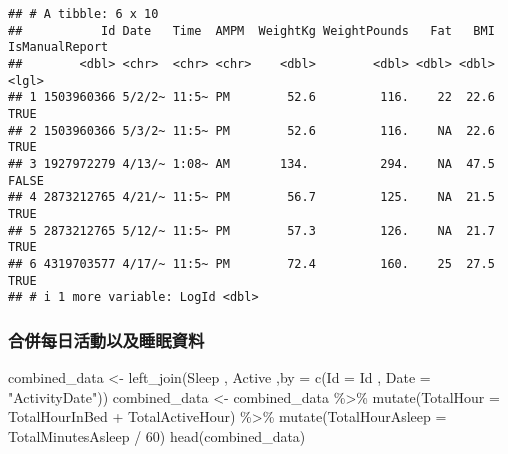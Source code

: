 \documentclass[
]{article}
\newenvironment{Shaded}{\begin{snugshade}}{\end{snugshade}}
\newcommand{\AttributeTok}[1]{\textcolor[rgb]{0.77,0.63,0.00}{#1}}
\newcommand{\DecValTok}[1]{\textcolor[rgb]{0.00,0.00,0.81}{#1}}
\newcommand{\FunctionTok}[1]{\textcolor[rgb]{0.00,0.00,0.00}{#1}}
\newcommand{\NormalTok}[1]{#1}
\newcommand{\OtherTok}[1]{\textcolor[rgb]{0.56,0.35,0.01}{#1}}
\newcommand{\SpecialCharTok}[1]{\textcolor[rgb]{0.00,0.00,0.00}{#1}}
\newcommand{\StringTok}[1]{\textcolor[rgb]{0.31,0.60,0.02}{#1}}
\begin{document}
\begin{verbatim}
## # A tibble: 6 x 10
##           Id Date   Time  AMPM  WeightKg WeightPounds   Fat   BMI IsManualReport
##        <dbl> <chr>  <chr> <chr>    <dbl>        <dbl> <dbl> <dbl> <lgl>         
## 1 1503960366 5/2/2~ 11:5~ PM        52.6         116.    22  22.6 TRUE          
## 2 1503960366 5/3/2~ 11:5~ PM        52.6         116.    NA  22.6 TRUE          
## 3 1927972279 4/13/~ 1:08~ AM       134.          294.    NA  47.5 FALSE         
## 4 2873212765 4/21/~ 11:5~ PM        56.7         125.    NA  21.5 TRUE          
## 5 2873212765 5/12/~ 11:5~ PM        57.3         126.    NA  21.7 TRUE          
## 6 4319703577 4/17/~ 11:5~ PM        72.4         160.    25  27.5 TRUE          
## # i 1 more variable: LogId <dbl>
\end{verbatim}

\hypertarget{ux5408ux4f75ux6bcfux65e5ux6d3bux52d5ux4ee5ux53caux7761ux7720ux8cc7ux6599}{%
\subsubsection{合併每日活動以及睡眠資料}\label{ux5408ux4f75ux6bcfux65e5ux6d3bux52d5ux4ee5ux53caux7761ux7720ux8cc7ux6599}}

\begin{Shaded}
\begin{Highlighting}[]
\NormalTok{combined\_data }\OtherTok{\textless{}{-}} \FunctionTok{left\_join}\NormalTok{(Sleep , Active ,}\AttributeTok{by =} \FunctionTok{c}\NormalTok{(}\StringTok{\textquotesingle{}Id\textquotesingle{}}  \OtherTok{=} \StringTok{\textquotesingle{}Id\textquotesingle{}}\NormalTok{ , }\StringTok{\textquotesingle{}Date\textquotesingle{}} \OtherTok{=} \StringTok{"ActivityDate"}\NormalTok{))}
\NormalTok{combined\_data }\OtherTok{\textless{}{-}}\NormalTok{ combined\_data }\SpecialCharTok{\%\textgreater{}\%} 
  \FunctionTok{mutate}\NormalTok{(}\AttributeTok{TotalHour =}\NormalTok{ TotalHourInBed }\SpecialCharTok{+}\NormalTok{ TotalActiveHour) }\SpecialCharTok{\%\textgreater{}\%} 
  \FunctionTok{mutate}\NormalTok{(}\AttributeTok{TotalHourAsleep =}\NormalTok{ TotalMinutesAsleep }\SpecialCharTok{/} \DecValTok{60}\NormalTok{)}
\FunctionTok{head}\NormalTok{(combined\_data)}
\end{Highlighting}
\end{Shaded}
\end{document}
